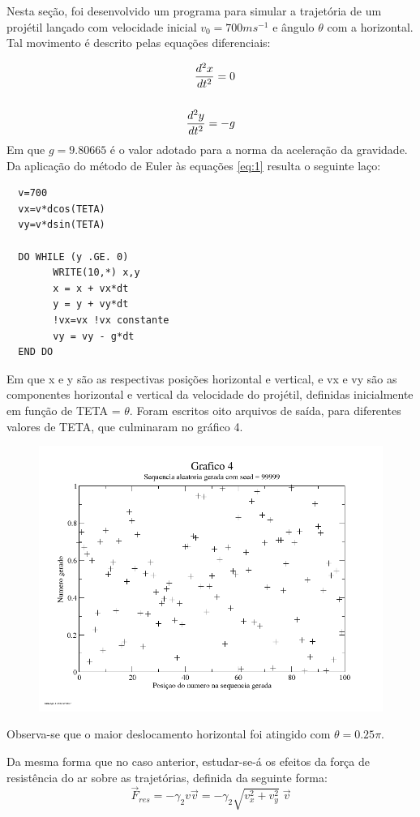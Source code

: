 \documentclass{article}
\begin{document}
Nesta seção, foi desenvolvido um programa para simular a trajetória de um projétil lançado com velocidade inicial \(v_0 = 700ms^{-1}\) e ângulo \(\theta\) com a horizontal. Tal movimento é descrito pelas equações diferenciais:

\begin{equation}
  \label{eq:1}
  \begin{split}
  {d^2 x \over dt^2} = 0\\
\\
  {d^2y \over dt^2}= -g
\end{split}
\end{equation}
Em que $g = 9.80665$ é o valor adotado para a norma da aceleração da gravidade.
Da aplicação do método de Euler às equações \ref{eq:1} resulta o seguinte laço:

\begin{lstlisting}
  v=700
  vx=v*dcos(TETA)
  vy=v*dsin(TETA)

  DO WHILE (y .GE. 0)
        WRITE(10,*) x,y
        x = x + vx*dt
        y = y + vy*dt
        !vx=vx !vx constante
        vy = vy - g*dt
  END DO
\end{lstlisting}

Em que x e y são as respectivas posições horizontal e vertical, e vx e vy são as componentes horizontal e vertical da velocidade do projétil, definidas inicialmente em função de TETA = $\theta$.
Foram escritos oito arquivos de saída, para diferentes valores de TETA, que culminaram no gráfico 4.\par

\begin{figure}[h!]
  \centering
  \includegraphics[width=.64\textwidth]{2/graf4}\par
\end{figure}


Observa-se que o maior deslocamento horizontal foi atingido com $\theta = 0.25 \pi$.\par
Da mesma forma que no caso anterior, estudar-se-á os efeitos da força de resistência do ar sobre as trajetórias, definida da seguinte forma:
\begin{equation}
  \label{eq:2}
  \vec{F}_{res} = -\gamma_2v\vec{v} = - \gamma_2 \sqrt{v_x^2 + v_y^2}\;\vec{v}
\end{equation}
\end{document}
